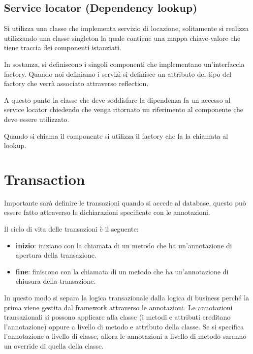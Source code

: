 \subsection{Service locator (Dependency lookup)}
Si utilizza una classe che implementa servizio di locazione, solitamente si
realizza utilizzando una classe singleton la quale contiene una mappa chiave-valore
che tiene traccia dei componenti istanziati.

In sostanza, si definiscono i singoli componenti che implementano un'interfaccia
factory. Quando noi definiamo i servizi si definisce un attributo del tipo del
factory che verrà associato attraverso reflection.

A questo punto la classe che deve soddisfare la dipendenza fa un accesso al service
locator chiedendo che venga ritornato un riferimento al componente che deve essere
utilizzato.

Quando si chiama il componente si utilizza il factory che fa la chiamata al lookup.
\section{Transaction}
Importante sarà definire le transazioni quando si accede al database, questo può
essere fatto attraverso le dichiarazioni specificate con le annotazioni.

Il ciclo di vita delle transazioni è il seguente:
\begin{itemize}
      \item \textbf{inizio}: iniziano con la chiamata di un metodo che ha un'annotazione
            di apertura della transazione.
      \item \textbf{fine}: finiscono con la chiamata di un metodo che ha un'annotazione
            di chiusura della transazione.
\end{itemize}
In questo modo si separa la logica transazionale dalla logica di business perché
la prima viene gestita dal framework attraverso le annotazioni. Le annotazioni
transazionali si possono applicare alla classe (i metodi e attributi ereditano
l'annotazione) oppure a livello di metodo e attributo della classe. Se si specifica
l'annotazione a livello di classe, allora le annotazioni a livello di metodo
saranno un override di quella della classe.

